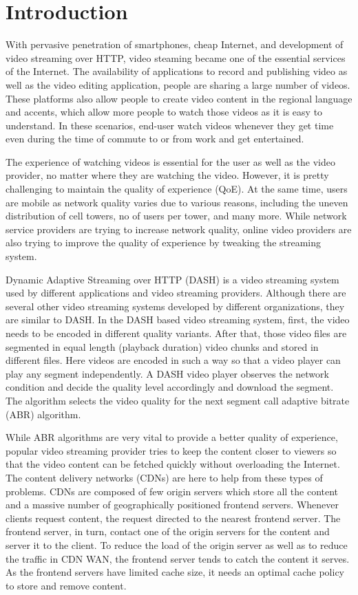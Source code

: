 \section{Introduction}
With pervasive penetration of smartphones, cheap Internet, and development of video streaming over HTTP, video steaming became one of the essential services of the Internet. The availability of applications to record and publishing video as well as the video editing application, people are sharing a large number of videos. These platforms also allow people to create video content in the regional language and accents, which allow more people to watch those videos as it is easy to understand. In these scenarios, end-user watch videos whenever they get time even during the time of commute to or from work and get entertained.

The experience of watching videos is essential for the user as well as the video provider, no matter where they are watching the video. However, it is pretty challenging to maintain the quality of experience (QoE). At the same time, users are mobile as network quality varies due to various reasons, including the uneven distribution of cell towers, no of users per tower, and many more. While network service providers are trying to increase network quality, online video providers are also trying to improve the quality of experience by tweaking the streaming system.

Dynamic Adaptive Streaming over HTTP (DASH) is a video streaming system used by different applications and video streaming providers. Although there are several other video streaming systems developed by different organizations, they are similar to DASH. In the DASH based video streaming system, first, the video needs to be encoded in different quality variants. After that, those video files are segmented in equal length (playback duration) video chunks and stored in different files. Here videos are encoded in such a way so that a video player can play any segment independently. A DASH video player observes the network condition and decide the quality level accordingly and download the segment. The algorithm selects the video quality for the next segment call adaptive bitrate (ABR) algorithm.

While ABR algorithms are very vital to provide a better quality of experience, popular video streaming provider tries to keep the content closer to viewers so that the video content can be fetched quickly without overloading the Internet. The content delivery networks (CDNs) are here to help from these types of problems. CDNs are composed of few origin servers which store all the content and a massive number of geographically positioned frontend servers. Whenever clients request content, the request directed to the nearest frontend server. The frontend server, in turn, contact one of the origin servers for the content and server it to the client. To reduce the load of the origin server as well as to reduce the traffic in CDN WAN, the frontend server tends to catch the content it serves. As the frontend servers have limited cache size, it needs an optimal cache policy to store and remove content.

